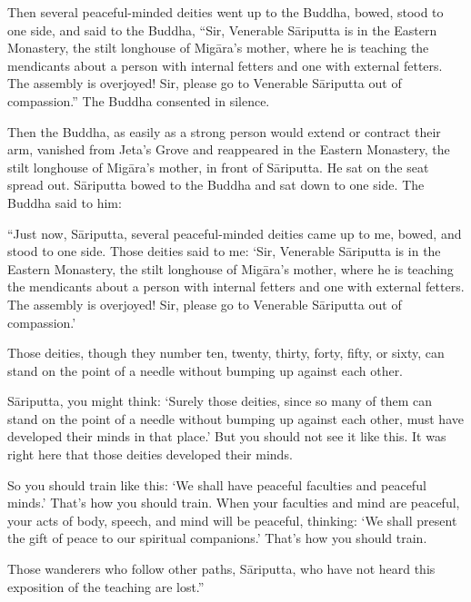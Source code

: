 \documentclass[12pt,openany]{book}%
\begin{document}
Then several peaceful-minded deities went up to the Buddha, bowed, stood to one side, and said to the Buddha, “Sir, Venerable \textsanskrit{Sāriputta} is in the Eastern Monastery, the stilt longhouse of \textsanskrit{Migāra}’s mother, where he is teaching the mendicants about a person with internal fetters and one with external fetters. The assembly is overjoyed! Sir, please go to Venerable \textsanskrit{Sāriputta} out of compassion.” The Buddha consented in silence. 

Then the Buddha, as easily as a strong person would extend or contract their arm, vanished from Jeta’s Grove and reappeared in the Eastern Monastery, the stilt longhouse of \textsanskrit{Migāra}’s mother, in front of \textsanskrit{Sāriputta}. He sat on the seat spread out. \textsanskrit{Sāriputta} bowed to the Buddha and sat down to one side. The Buddha said to him: 

“Just now, \textsanskrit{Sāriputta}, several peaceful-minded deities came up to me, bowed, and stood to one side. Those deities said to me: ‘Sir, Venerable \textsanskrit{Sāriputta} is in the Eastern Monastery, the stilt longhouse of \textsanskrit{Migāra}’s mother, where he is teaching the mendicants about a person with internal fetters and one with external fetters. The assembly is overjoyed! Sir, please go to Venerable \textsanskrit{Sāriputta} out of compassion.’ 

Those deities, though they number ten, twenty, thirty, forty, fifty, or sixty, can stand on the point of a needle without bumping up against each other. 

\textsanskrit{Sāriputta}, you might think: ‘Surely those deities, since so many of them can stand on the point of a needle without bumping up against each other, must have developed their minds in that place.’ But you should not see it like this. It was right here that those deities developed their minds. 

So you should train like this: ‘We shall have peaceful faculties and peaceful minds.’ That’s how you should train. When your faculties and mind are peaceful, your acts of body, speech, and mind will be peaceful, thinking: ‘We shall present the gift of peace to our spiritual companions.’ That’s how you should train. 

Those wanderers who follow other paths, \textsanskrit{Sāriputta}, who have not heard this exposition of the teaching are lost.” 
\end{document}
